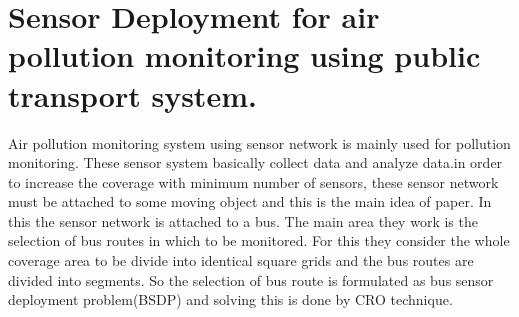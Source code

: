 \documentclass[11pt]{article}
\begin{document}
\section{Sensor Deployment for air pollution monitoring using public transport system.}\cite{Yu2012}

Air pollution monitoring system using sensor network is mainly used for pollution monitoring. These sensor system basically collect data and analyze data.in order to increase the coverage with minimum number of sensors, these sensor network must be attached to some moving object and this is the main idea of paper. In this the sensor network is attached to a bus. The main area they work is the selection of bus routes in which to be monitored. For this they consider the whole coverage area to be divide into identical square grids and the bus routes are divided into segments. So the selection of bus route is formulated as bus sensor deployment problem(BSDP) and solving this is done by CRO technique.




\end{document}
